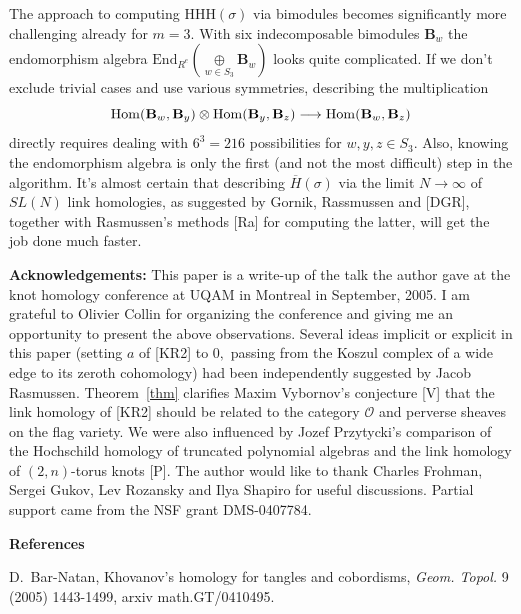 \documentclass[12pt]{article}
\newcommand{\oplusop}[1]{{\mathop{\oplus}\limits_{#1}}}
\begin{document}
\vspace{0.2in} 

The approach to computing $\mathrm{HHH}(\sigma)$ 
via bimodules becomes significantly more challenging already for $m=3.$ 
With six indecomposable bimodules $\mathbf{B}_w$ 
the endomorphism algebra $\mathrm{End}_{R^e}(\oplusop{w\in S_3}
 \mathbf{B}_w)$
looks quite complicated. If we don't exclude trivial cases and use 
various symmetries, describing the multiplication   
$$ \mathrm{Hom}(\mathbf{B}_w, \mathbf{B}_y) \otimes 
   \mathrm{Hom}(\mathbf{B}_y, \mathbf{B}_z) \longrightarrow 
   \mathrm{Hom}(\mathbf{B}_w, \mathbf{B}_z)$$
directly requires dealing with $6^3=216$ possibilities for $w,y,z\in S_3.$ 
Also, knowing the endomorphism algebra is only the first (and not the most difficult) 
step in the algorithm. It's almost certain that describing $\overline{H}(\sigma)$ via 
the limit $N\to \infty$ of $SL(N)$ link homologies, as suggested by 
Gornik, Rassmussen and [DGR], 
together with Rasmussen's methods [Ra] for computing the latter, will get 
the job done much faster. 

\vspace{0.2in} 

{\bf Acknowledgements:} This paper is a write-up of the talk 
the author gave at the knot homology conference at UQAM in Montreal 
in September, 2005. I am grateful to Olivier Collin for 
organizing the conference and giving me an opportunity to present 
the above observations. Several ideas implicit or explicit in this paper 
(setting $a$ of [KR2] to $0,$ passing from the Koszul complex of a wide 
edge to its zeroth cohomology) had been independently suggested by 
Jacob Rasmussen. Theorem~\ref{thm} clarifies 
Maxim Vybornov's conjecture [V] that the link homology of [KR2] should 
be related to the category $\mathcal{O}$ and perverse sheaves 
on the flag variety. We were also influenced by Jozef Przytycki's 
 comparison of the Hochschild homology 
of truncated polynomial algebras and the link homology of $(2,n)$-torus 
knots [P]. The author would like to thank Charles Frohman, Sergei Gukov, 
Lev Rozansky and Ilya Shapiro for useful discussions. 
Partial support came from the NSF grant DMS-0407784. 

      
     


\vspace{0.2in} 

{\bf References} 

\noindent
[BN1] D.~Bar-Natan, Khovanov's homology for tangles and cobordisms, 
\emph{Geom. Topol.}  9 (2005) 1443-1499, arxiv  math.GT/0410495. 
\end{document}
